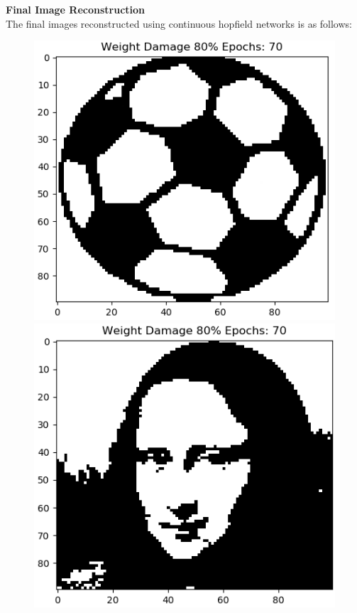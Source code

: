 \documentclass[12pt,a4paper]{article}
\newcommand{\noi}{\noindent}
\begin{document}
\noi
\textbf{Final Image Reconstruction}\\
The final images reconstructed using continuous hopfield networks is as follows:
\begin{figure}[H]
\centering
\includegraphics[scale=0.34]{images/ball_chn_80_end.png}
\includegraphics[scale=0.34]{images/mona_chn_80_end.png}

\end{figure}
\end{document}
